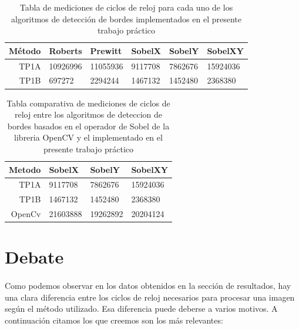 \documentclass[11pt, a4paper]{article}
\begin{document}
\begin{table}[ht] %
\centering %
\begin{tabular}{|r|l|l|l|l|l|}
\hline
M\'etodo & Roberts & Prewitt & SobelX & SobelY & SobelXY \\
\hline
TP1A & 10926996 & 11055936 & 9117708 & 7862676 & 15924036 \\
\hline
TP1B & 697272 & 2294244 & 1467132 & 1452480 & 2368380 \\
\hline
\end{tabular}

\caption{Tabla de mediciones de ciclos de reloj para cada uno de los algoritmos de detecci\'on de bordes implementados en el presente trabajo pr\'actico} %
\label{Tiempo metodos} %
\end{table}
\vspace{30pt}

\begin{table}[ht] %
\centering %
\begin{tabular}{|r|l|l|l|}
\hline
Metodo & SobelX & SobelY & SobelXY \\
\hline
TP1A & 9117708 & 7862676 & 15924036 \\
\hline
TP1B & 1467132 & 1452480 & 2368380 \\
\hline
OpenCv & 21603888 & 19262892 & 20204124 \\
\hline



\end{tabular}

\caption{Tabla comparativa de mediciones de ciclos de reloj entre los algoritmos de deteccion de bordes basados en el operador de Sobel de la libreria OpenCV y el implementado en el presente trabajo pr\'actico} %
\label{Tiempo comparacion} %
\end{table}


\newpage
\section{Debate}
\paragraph{}
Como podemos observar en los datos obtenidos en la secci\'on de resultados, hay una clara diferencia entre los ciclos de reloj necesarios para procesar una imagen seg\'un el m\'etodo utilizado. Esa diferencia puede deberse a varios motivos. A continuaci\'on citamos los que creemos son los m\'as relevantes:
\end{document}
